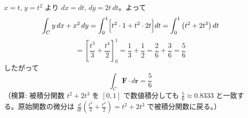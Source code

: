 
$x = t$, $y = t^{2}$ より $dx = dt$, $dy = 2t\,dt$。よって
\[
\int_{C} y\,dx + x^{2}\,dy = \int_{0}^{1} \Bigl[ t^{2} \cdot 1 + t^{2} \cdot 2t \Bigr] dt
= \int_{0}^{1} \left( t^{2} + 2t^{3} \right) dt
\]
\[
= \left[ \frac{t^{3}}{3} + \frac{t^{4}}{2} \right]_{0}^{1} = \frac{1}{3} + \frac{1}{2} = \frac{2}{6} + \frac{3}{6} = \frac{5}{6}
\]
したがって
\[
\boxed{\; \int_{C} \bm{F}\cdot d\bm{r} = \frac{5}{6} \;}
\]
（検算: 被積分関数 $t^{2}+2t^{3}$ を $[0,1]$ で数値積分しても $\frac{5}{6}\approx 0.8333$ と一致する。原始関数の微分は $\frac{d}{dt}\left(\frac{t^3}{3}+\frac{t^4}{2}\right)=t^2+2t^3$ で被積分関数に戻る。）
